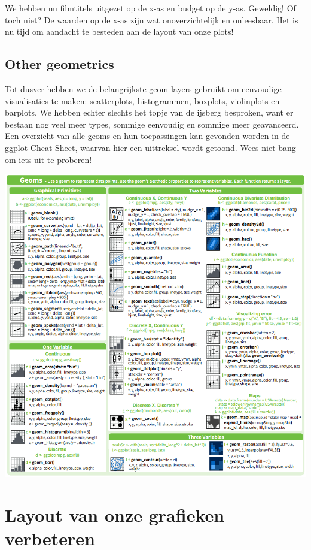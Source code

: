 \documentclass[]{tufte-book}
\begin{document}
We hebben nu filmtitels uitgezet op de x-as en budget op de y-as. Geweldig! Of toch niet? De waarden op de x-as zijn wat onoverzichtelijk en onleesbaar. Het is nu tijd om aandacht te besteden aan de layout van onze plots!

\hypertarget{other-geometrics}{%
\subsection{Other geometrics}\label{other-geometrics}}

Tot dusver hebben we de belangrijkste geom-layers gebruikt om eenvoudige visualisaties te maken: scatterplots, histogrammen, boxplots, violinplots en barplots. We hebben echter slechts het topje van de ijsberg besproken, want er bestaan nog veel meer types, sommige eenvoudig en sommige meer geavanceerd. Een overzicht van alle geoms en hun toepassingen kan gevonden worden in de \href{https://www.rstudio.com/wp-content/uploads/2015/12/ggplot2-cheatsheet-2.0.pdf}{ggplot Cheat Sheet}, waarvan hier een uittreksel wordt getoond. Wees niet bang om iets uit te proberen!

\includegraphics{images/geoms.PNG}

\hypertarget{layout-van-onze-grafieken-verbeteren}{%
\section{Layout van onze grafieken verbeteren}\label{layout-van-onze-grafieken-verbeteren}}
\end{document}
